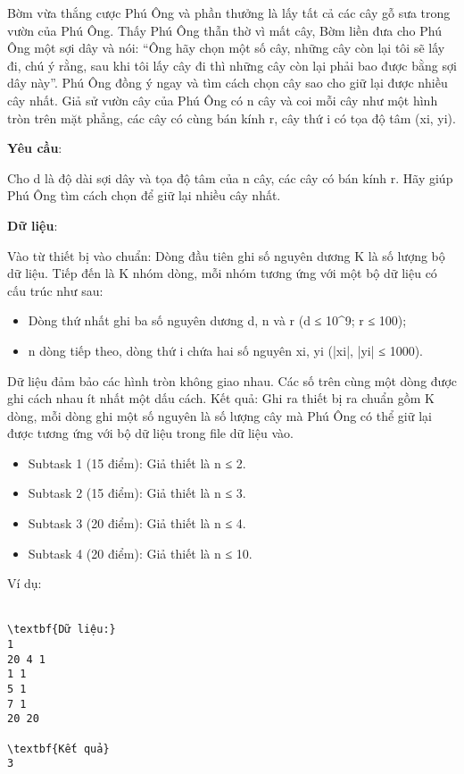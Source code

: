 

Bờm vừa thắng cược Phú Ông và phần thưởng là lấy tất cả các cây gỗ sưa trong vườn của Phú Ông. Thấy Phú Ông thẫn thờ vì mất cây, Bờm liền đưa cho Phú Ông một sợi dây và nói: “Ông hãy chọn một số cây, những cây còn lại tôi sẽ lấy đi, chú ý rằng, sau khi tôi lấy cây đi thì những cây còn lại phải bao được bằng sợi dây này”. Phú Ông đồng ý ngay và tìm cách chọn cây sao cho giữ lại được nhiều cây nhất. Giả sử vườn cây của Phú Ông có n cây và coi mỗi cây như một hình tròn trên mặt phẳng, các cây có cùng bán kính r, cây thứ i có tọa độ tâm (xi, yi).

\textbf{Yêu cầu}:

Cho d là độ dài sợi dây và tọa độ tâm của n cây, các cây có bán kính r. Hãy giúp Phú Ông tìm cách chọn để giữ lại nhiều cây nhất.

\textbf{Dữ liệu}:

Vào từ thiết bị vào chuẩn: Dòng đầu tiên ghi số nguyên dương K là số lượng bộ dữ liệu. Tiếp đến là K nhóm dòng, mỗi nhóm tương ứng với một bộ dữ liệu có cấu trúc như sau:
\begin{itemize}
	\item Dòng thứ nhất ghi ba số nguyên dương d, n và r (d ≤ 10\textasciicircum9; r ≤ 100);
	\item n dòng tiếp theo, dòng thứ i chứa hai số nguyên xi, yi (|xi|, |yi| ≤ 1000).
\end{itemize}

Dữ liệu đảm bảo các hình tròn không giao nhau. Các số trên cùng một dòng được ghi cách nhau ít nhất một dấu cách. Kết quả: Ghi ra thiết bị ra chuẩn gồm K dòng, mỗi dòng ghi một số nguyên là số lượng cây mà Phú Ông có thể giữ lại được tương ứng với bộ dữ liệu trong file dữ liệu vào.
\begin{itemize}
	\item Subtask 1 (15 điểm): Giả thiết là n ≤ 2.
	\item Subtask 2 (15 điểm): Giả thiết là n ≤ 3.
	\item Subtask 3 (20 điểm): Giả thiết là n ≤ 4.
	\item Subtask 4 (20 điểm): Giả thiết là n ≤ 10.
\end{itemize}Ví dụ:
\\​
\begin{verbatim}
\textbf{Dữ liệu:}
1
20 4 1
1 1
5 1
7 1
20 20

\textbf{Kết quả}
3\end{verbatim}